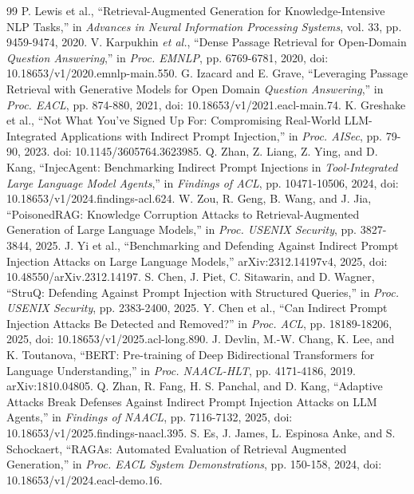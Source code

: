 \documentclass[conference,a4paper]{IEEEtran}
\begin{document}
\begin{thebibliography}{99}
 P. Lewis et al., ``Retrieval-Augmented Generation for Knowledge-Intensive NLP Tasks,'' in \emph{Advances in Neural Information Processing Systems}, vol. 33, pp. 9459-9474, 2020.
 V. Karpukhin \emph{et al.}, ``Dense Passage Retrieval for Open-Domain \emph{Question Answering},'' in \emph{Proc. EMNLP}, pp. 6769-6781, 2020, doi: 10.18653/v1/2020.emnlp-main.550.
 G. Izacard and E. Grave, ``Leveraging Passage Retrieval with Generative Models for Open Domain \emph{Question Answering},'' in \emph{Proc. EACL}, pp. 874-880, 2021, doi: 10.18653/v1/2021.eacl-main.74.
 K. Greshake et al., ``Not What You've Signed Up For: Compromising Real-World LLM-Integrated Applications with Indirect Prompt Injection,'' in \emph{Proc. AISec}, pp. 79-90, 2023. doi: 10.1145/3605764.3623985.
 Q. Zhan, Z. Liang, Z. Ying, and D. Kang, ``InjecAgent: Benchmarking Indirect Prompt Injections in \emph{Tool-Integrated Large Language Model Agents},'' in \emph{Findings of ACL}, pp. 10471-10506, 2024, doi: 10.18653/v1/2024.findings-acl.624.
 W. Zou, R. Geng, B. Wang, and J. Jia, ``PoisonedRAG: Knowledge Corruption Attacks to Retrieval-Augmented Generation of Large Language Models,'' in \emph{Proc. USENIX Security}, pp. 3827-3844, 2025.
 J. Yi et al., ``Benchmarking and Defending Against Indirect Prompt Injection Attacks on Large Language Models,'' arXiv:2312.14197v4, 2025, doi: 10.48550/arXiv.2312.14197.
 S. Chen, J. Piet, C. Sitawarin, and D. Wagner, ``StruQ: Defending Against Prompt Injection with Structured Queries,'' in \emph{Proc. USENIX Security}, pp. 2383-2400, 2025.
 Y. Chen et al., ``Can Indirect Prompt Injection Attacks Be Detected and Removed?'' in \emph{Proc. ACL}, pp. 18189-18206, 2025, doi: 10.18653/v1/2025.acl-long.890.
 J. Devlin, M.-W. Chang, K. Lee, and K. Toutanova, ``BERT: Pre-training of Deep Bidirectional Transformers for Language Understanding,'' in \emph{Proc. NAACL-HLT}, pp. 4171-4186, 2019. arXiv:1810.04805.
 Q. Zhan, R. Fang, H. S. Panchal, and D. Kang, ``Adaptive Attacks Break Defenses Against Indirect Prompt Injection Attacks on LLM Agents,'' in \emph{Findings of NAACL}, pp. 7116-7132, 2025, doi: 10.18653/v1/2025.findings-naacl.395.
 S. Es, J. James, L. Espinosa Anke, and S. Schockaert, ``RAGAs: Automated Evaluation of Retrieval Augmented Generation,'' in \emph{Proc. EACL System Demonstrations}, pp. 150-158, 2024, doi: 10.18653/v1/2024.eacl-demo.16.

\end{thebibliography}
\end{document}
